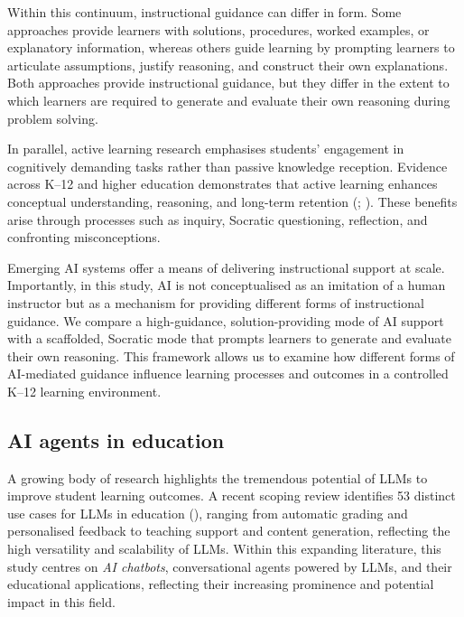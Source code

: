 \documentclass[
  11pt,
]{article}
\begin{document}
Within this continuum, instructional guidance can differ in form. Some approaches provide learners with solutions, procedures, worked examples, or explanatory information, whereas others guide learning by prompting learners to articulate assumptions, justify reasoning, and construct their own explanations. Both approaches provide instructional guidance, but they differ in the extent to which learners are required to generate and evaluate their own reasoning during problem solving.

In parallel, active learning research emphasises students' engagement in cognitively demanding tasks rather than passive knowledge reception. Evidence across K--12 and higher education demonstrates that active learning enhances conceptual understanding, reasoning, and long-term retention (; ). These benefits arise through processes such as inquiry, Socratic questioning, reflection, and confronting misconceptions.

Emerging AI systems offer a means of delivering instructional support at scale. Importantly, in this study, AI is not conceptualised as an imitation of a human instructor but as a mechanism for providing different forms of instructional guidance. We compare a high-guidance, solution-providing mode of AI support with a scaffolded, Socratic mode that prompts learners to generate and evaluate their own reasoning. This framework allows us to examine how different forms of AI-mediated guidance influence learning processes and outcomes in a controlled K--12 learning environment.

\subsection{AI agents in education}\label{ai-agents-in-education}

A growing body of research highlights the tremendous potential of LLMs to improve student learning outcomes. A recent scoping review identifies 53 distinct use cases for LLMs in education (), ranging from automatic grading and personalised feedback to teaching support and content generation, reflecting the high versatility and scalability of LLMs. Within this expanding literature, this study centres on \emph{AI chatbots}, conversational agents powered by LLMs, and their educational applications, reflecting their increasing prominence and potential impact in this field.
\end{document}
